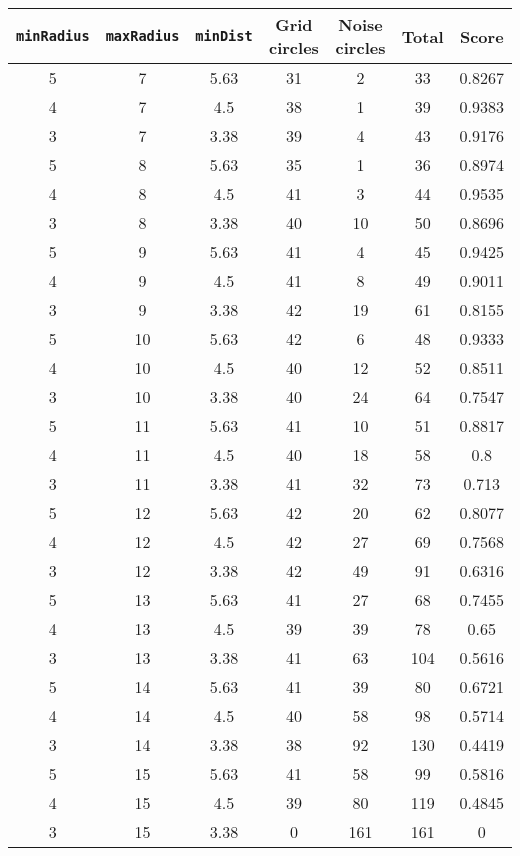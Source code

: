 \documentclass[letterpaper, 12pt]{article}
\begin{document}
\begin{longtable}{|c|c|c|c|c|c|c|}
\hline
\textbf{\texttt{minRadius}} & \textbf{\texttt{maxRadius}} & \textbf{\texttt{minDist}} & \textbf{Grid circles} & \textbf{Noise circles} & \textbf{Total} & \textbf{Score} \\
\hline
5 & 7 & 5.63 & 31 & 2 & 33 & 0.8267 \\
\hline
4 & 7 & 4.5 & 38 & 1 & 39 & 0.9383 \\
\hline
3 & 7 & 3.38 & 39 & 4 & 43 & 0.9176 \\
\hline
5 & 8 & 5.63 & 35 & 1 & 36 & 0.8974 \\
\hline
4 & 8 & 4.5 & 41 & 3 & 44 & 0.9535 \\
\hline
3 & 8 & 3.38 & 40 & 10 & 50 & 0.8696 \\
\hline
5 & 9 & 5.63 & 41 & 4 & 45 & 0.9425 \\
\hline
4 & 9 & 4.5 & 41 & 8 & 49 & 0.9011 \\
\hline
3 & 9 & 3.38 & 42 & 19 & 61 & 0.8155 \\
\hline
5 & 10 & 5.63 & 42 & 6 & 48 & 0.9333 \\
\hline
4 & 10 & 4.5 & 40 & 12 & 52 & 0.8511 \\
\hline
3 & 10 & 3.38 & 40 & 24 & 64 & 0.7547 \\
\hline
5 & 11 & 5.63 & 41 & 10 & 51 & 0.8817 \\
\hline
4 & 11 & 4.5 & 40 & 18 & 58 & 0.8 \\
\hline
3 & 11 & 3.38 & 41 & 32 & 73 & 0.713 \\
\hline
5 & 12 & 5.63 & 42 & 20 & 62 & 0.8077 \\
\hline
4 & 12 & 4.5 & 42 & 27 & 69 & 0.7568 \\
\hline
3 & 12 & 3.38 & 42 & 49 & 91 & 0.6316 \\
\hline
5 & 13 & 5.63 & 41 & 27 & 68 & 0.7455 \\
\hline
4 & 13 & 4.5 & 39 & 39 & 78 & 0.65 \\
\hline
3 & 13 & 3.38 & 41 & 63 & 104 & 0.5616 \\
\hline
5 & 14 & 5.63 & 41 & 39 & 80 & 0.6721 \\
\hline
4 & 14 & 4.5 & 40 & 58 & 98 & 0.5714 \\
\hline
3 & 14 & 3.38 & 38 & 92 & 130 & 0.4419 \\
\hline
5 & 15 & 5.63 & 41 & 58 & 99 & 0.5816 \\
\hline
4 & 15 & 4.5 & 39 & 80 & 119 & 0.4845 \\
\hline
3 & 15 & 3.38 & 0 & 161 & 161 & 0 \\

\end{longtable}
\end{document}
